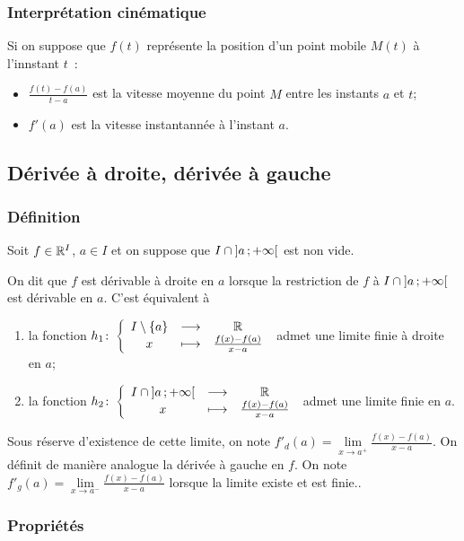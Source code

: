 \subsubsection{Interprétation cinématique}
Si on suppose que \(f(t)\) représente la position d'un point mobile \(M(t)\) à l'innstant \(t\)~:
\begin{itemize}
\item \(\frac{f(t)-f(a)}{t-a}\) est la vitesse moyenne du point \(M\) entre les instants \(a\) et \(t\);
\item \(f'(a)\) est la vitesse instantannée à l'instant \(a\).
\end{itemize}

\subsection{Dérivée à droite, dérivée à gauche}

\subsubsection{Définition}
Soit \(f \in \mathbb{R}^I\), \(a \in I\) et on suppose que \(I \cap \left] a \, ;  +\infty \right[\) est non vide.
\begin{defdef}
  On dit que \(f\) est dérivable à droite en \(a\) lorsque la restriction de \(f\) à \(I \cap \left] a \, ;  +\infty \right[\) est dérivable en \(a\). C'est équivalent à
  \begin{enumerate}
  \item la fonction \(h_1\colon \left\{\begin{array}{ccc} I\setminus\{a\} & \longrightarrow &\mathbb{R}\\ x & \longmapsto & \frac{f(x)-f(a)}{x-a} \end{array} \right.\) admet une limite finie à droite en \(a\);
  \item la fonction \(h_2\colon \left\{\begin{array}{ccc} I \cap \left] a \, ;  +\infty \right[ & \longrightarrow &\mathbb{R}\\ x & \longmapsto & \frac{f(x)-f(a)}{x-a} \end{array} \right.\) admet une limite finie en \(a\).
  \end{enumerate}
  Sous réserve d'existence de cette limite, on note \(f'_d(a) = \lim\limits_{x \to a^+}\frac{f(x)-f(a)}{x-a}\). On définit de manière analogue la dérivée à gauche en \(f\). On note \(f'_g(a) = \lim\limits_{x \to a^-}\frac{f(x)-f(a)}{x-a}\) lorsque la limite existe et est finie..
\end{defdef}

\subsubsection{Propriétés}

